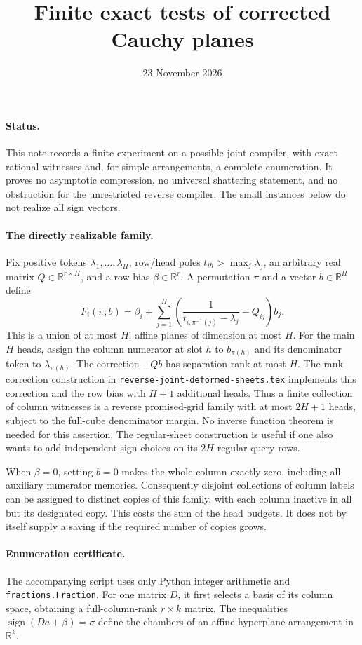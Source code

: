 \documentclass[11pt]{article}
\title{Finite exact tests of corrected Cauchy planes}
\author{}
\date{23 November 2026}
\begin{document}
\maketitle

\paragraph{Status.}
This note records a finite experiment on a possible joint compiler, with exact
rational witnesses and, for simple arrangements, a complete enumeration.
It proves no asymptotic compression, no universal shattering statement, and
no obstruction for the unrestricted reverse compiler.  The small instances
below do not realize all sign vectors.

\paragraph{The directly realizable family.}
Fix positive tokens $\lambda_1,\ldots,\lambda_H$, row/head poles
$t_{ih}>\max_j\lambda_j$, an arbitrary real matrix $Q\in\mathbb R^{r\times H}$,
and a row bias $\beta\in\mathbb R^r$.  A permutation $\pi$ and a vector
$b\in\mathbb R^H$ define
\[
 F_i(\pi,b)=\beta_i+\sum_{j=1}^H
 \left(\frac1{t_{i,\pi^{-1}(j)}-\lambda_j}-Q_{ij}\right)b_j.
\]
This is a union of at most $H!$ affine planes of dimension at most $H$.
For the main $H$ heads, assign the column numerator at slot $h$ to
$b_{\pi(h)}$ and its denominator token to $\lambda_{\pi(h)}$.
The correction $-Qb$ has separation rank at most $H$.
The rank correction construction in \texttt{reverse-joint-deformed-sheets.tex}
implements this correction and the row bias with $H+1$ additional heads.
Thus a finite collection of column witnesses is a reverse promised-grid
family with at most $2H+1$ heads, subject to the full-cube denominator margin.
No inverse function theorem is needed for this assertion.  The regular-sheet
construction is useful if one also wants to add independent sign choices on
its $2H$ regular query rows.

When $\beta=0$, setting $b=0$ makes the whole column exactly zero, including
all auxiliary numerator memories.  Consequently disjoint collections of
column labels can be assigned to distinct copies of this family, with each
column inactive in all but its designated copy.  This costs the sum of the
head budgets.  It does not by itself supply a saving if the required number
of copies grows.

\paragraph{Enumeration certificate.}
The accompanying script uses only Python integer arithmetic and
\texttt{fractions.Fraction}.  For one matrix $D$, it first selects a basis of
its column space, obtaining a full-column-rank $r\times k$ matrix.  The
inequalities $\operatorname{sign}(Da+\beta)=\sigma$ define the chambers of
an affine hyperplane arrangement in $\mathbb R^k$.
\end{document}
